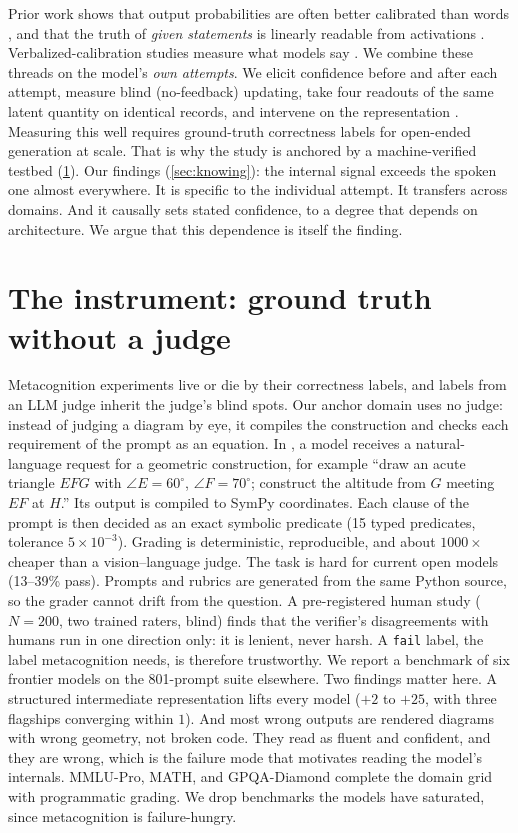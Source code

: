 \documentclass{article}
\begin{document}
Prior work shows that output probabilities are often better calibrated than words \citep{kadavath2022language}, and that the truth of \emph{given statements} is linearly readable from activations \citep{azaria2023internal, burns2023discovering, marks2024geometry}.
Verbalized-calibration studies measure what models say \citep{lin2022teaching, tian2023just}.
We combine these threads on the model's \emph{own attempts}.
We elicit confidence before and after each attempt, measure blind (no-feedback) updating, take four readouts of the same latent quantity on identical records, and intervene on the representation \citep{zou2023representation}.
Measuring this well requires ground-truth correctness labels for open-ended generation at scale.
That is why the study is anchored by a machine-verified testbed (\cref{sec:testbed}).
Our findings (\cref{sec:knowing}): the internal signal exceeds the spoken one almost everywhere.
It is specific to the individual attempt.
It transfers across domains.
And it causally sets stated confidence, to a degree that depends on architecture.
We argue that this dependence is itself the finding.

\section{The instrument: ground truth without a judge}
\label{sec:testbed}

Metacognition experiments live or die by their correctness labels, and labels from an LLM judge inherit the judge's blind spots.
Our anchor domain uses no judge: instead of judging a diagram by eye, it compiles the construction and checks each requirement of the prompt as an equation.
In \GeoGenBench, a model receives a natural-language request for a geometric construction, for example ``draw an acute triangle $EFG$ with $\angle E{=}60^\circ$, $\angle F{=}70^\circ$; construct the altitude from $G$ meeting $EF$ at $H$.''
Its output is compiled to SymPy coordinates.
Each clause of the prompt is then decided as an exact symbolic predicate (15 typed predicates, tolerance $5{\times}10^{-3}$).
Grading is deterministic, reproducible, and about $1000\times$ cheaper than a vision--language judge.
The task is hard for current open models (13--39\% pass).
Prompts and rubrics are generated from the same Python source, so the grader cannot drift from the question.
A pre-registered human study ($N{=}200$, two trained raters, blind) finds that the verifier's disagreements with humans run in one direction only: it is lenient, never harsh.
A \texttt{fail} label, the label metacognition needs, is therefore trustworthy.
We report a benchmark of six frontier models on the 801-prompt suite elsewhere.
Two findings matter here.
A structured intermediate representation lifts every model ($+2$ to $+25$\pp, with three flagships converging within $1$\pp).
And most wrong outputs are rendered diagrams with wrong geometry, not broken code.
They read as fluent and confident, and they are wrong, which is the failure mode that motivates reading the model's internals.
MMLU-Pro, MATH, and GPQA-Diamond complete the domain grid with programmatic grading.
We drop benchmarks the models have saturated, since metacognition is failure-hungry.
\end{document}
